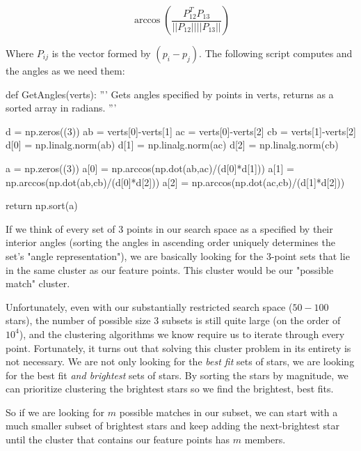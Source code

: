 \documentclass[paper=a4, fontsize=11pt]{scrartcl} %
\begin{document}
$$\arccos\left(\frac{P_{12}^TP_{13}}{||P_{12}||||P_{13}||}\right)$$

Where $P_{ij}$ is the vector formed by $(p_i - p_j)$.
The following script computes and the angles as we need them:

\begin{python}
def GetAngles(verts):
    '''
    Gets angles specified by points in verts,
    returns as a sorted array in radians.
    '''
    
    d = np.zeros((3))
    ab = verts[0]-verts[1]
    ac = verts[0]-verts[2]
    cb = verts[1]-verts[2]
    d[0] = np.linalg.norm(ab)
    d[1] = np.linalg.norm(ac)
    d[2] = np.linalg.norm(cb)
    
    a = np.zeros((3))
    a[0] = np.arccos(np.dot(ab,ac)/(d[0]*d[1]))
    a[1] = np.arccos(np.dot(ab,cb)/(d[0]*d[2]))
    a[2] = np.arccos(np.dot(ac,cb)/(d[1]*d[2]))
    
    return np.sort(a)
\end{python}

If we think of every set of 3 points in our search space as a specified by their interior angles (sorting the angles in ascending order uniquely determines the set's "angle representation"), we are basically looking for the 3-point sets that lie in the same cluster as our feature points. This cluster would be our "possible match" cluster.


Unfortunately, even with our substantially restricted search space ($50-100$ stars), the number of possible size 3 subsets is still quite large (on the order of $10^4$), and the clustering algorithms we know require us to iterate through every point. Fortunately, it turns out that solving this cluster problem in its entirety is not necessary. We are not only looking for the \textit{best fit} sets of stars, we are looking for the best fit \textit{and brightest} sets of stars. By sorting the stars by magnitude, we can prioritize clustering the brightest stars so we find the brightest, best fits.

So if we are looking for $m$ possible matches in our subset, we can start with a much smaller subset of brightest stars and keep adding the next-brightest star until the cluster that contains our feature points has $m$ members.
\end{document}
